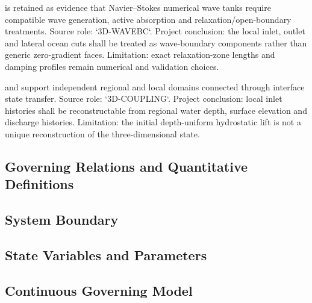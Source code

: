 \textcite{higuera2013realistic} is retained as evidence that
Navier--Stokes numerical wave tanks require compatible wave generation,
active absorption and relaxation/open-boundary treatments. Source
role: `3D-WAVEBC`. Project conclusion: the local inlet, outlet and
lateral ocean cuts shall be treated as wave-boundary components rather
than generic zero-gradient faces. Limitation: exact relaxation-zone
lengths and damping profiles remain numerical and validation choices.

\textcite{takase2016hybrid} and \textcite{romano2025coupling} support
independent regional and local domains connected through interface
state transfer. Source role: `3D-COUPLING`. Project conclusion: local
inlet histories shall be reconstructable from regional water depth,
surface elevation and discharge histories. Limitation: the initial
depth-uniform hydrostatic lift is not a unique reconstruction of the
three-dimensional state.

\subsection{Governing Relations and Quantitative Definitions}
\label{sec:res-mod-ibc-governing-relations}

%

\subsection{System Boundary}
\label{sec:res-mod-ibc-system-boundary}


\subsection{State Variables and Parameters}
\label{sec:res-mod-ibc-state-variables-parameters}


\subsection{Continuous Governing Model}
\label{sec:res-mod-ibc-continuous-governing-model}

